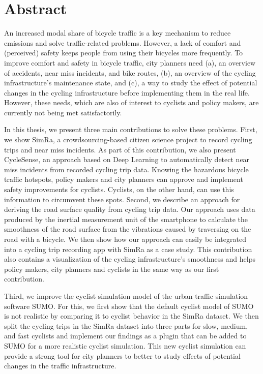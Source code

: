
\cleardoublepage
{}
\section*{Abstract}
An increased modal share of bicycle traffic is a key mechanism to reduce emissions and solve traffic-related problems.
However, a lack of comfort and (perceived) safety keeps people from using their bicycles more frequently.
To improve comfort and safety in bicycle traffic, city planners need (a), an overview of accidents, near miss incidents, and bike routes, (b), an overview of the cycling infrastructure's maintenance state, and (c), a way to study the effect of potential changes in the cycling infrastructure before implementing them in the real life.
However, these needs, which are also of interest to cyclists and policy makers, are currently not being met satisfactorily.

In this thesis, we present three main contributions to solve these problems.
First, we show SimRa, a crowdsourcing-based citizen science project to record cycling trips and near miss incidents.
As part of this contribution, we also present CycleSense, an approach based on Deep Learning to automatically detect near miss incidents from recorded cycling trip data.
Knowing the hazardous bicycle traffic hotspots, policy makers and city planners can approve and implement safety improvements for cyclists.
Cyclists, on the other hand, can use this information to circumvent these spots.
Second, we describe an approach for deriving the road surface quality from cycling trip data.
Our approach uses data produced by the inertial measurement unit of the smartphone to calculate the smoothness of the road surface from the vibrations caused by traversing on the road with a bicycle. 
We then show how our approach can easily be integrated into a cycling trip recording app with SimRa as a case study.
This contribution also contains a visualization of the cycling infrastructure's smoothness and helps policy makers, city planners and cyclists in the same way as our first contribution.

Third, we improve the cyclist simulation model of the urban traffic simulation software SUMO.
For this, we first show that the default cyclist model of SUMO is not realistic by comparing it to cyclist behavior in the SimRa dataset.
We then split the cycling trips in the SimRa dataset into three parts for slow, medium, and fast cyclists and implement our findings as a plugin that can be added to SUMO for a more realistic cyclist simulation.
This new cyclist simulation can provide a strong tool for city planners to better to study effects of potential changes in the traffic infrastructure. 


